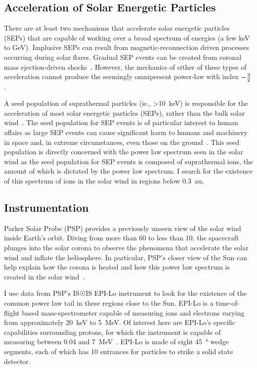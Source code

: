 \documentclass[letterpaper,11pt]{article}
\begin{document}
\subsection{Acceleration of Solar Energetic Particles}
There are at least two mechanisms that accelerate solar energetic particles (SEPs) that are capable of working over a broad spectrum of energies (a few \si{\kilo\electronvolt} to \si{\giga\electronvolt}).  Implusive SEPs can result from magnetic-reconnection driven processes occurring during solar flares.  Gradual SEP events can be created from coronal mass ejection-driven shocks~\citep{Desai2016}.  However, the mechanics of either of these types of acceleration cannot produce the seemingly omnipresent power-law with index $-{3 \over 2}$.

A seed population of suprathermal particles (ie., \SI{>10}{\kilo\electronvolt}) is responsible for the acceleration of most solar energetic particles (SEPs), rather than the bulk solar wind~\citep{Mewaldt2012}.  The seed population for SEP events is of particular interest to human affairs as large SEP events can cause significant harm to humans and machinery in space and, in extreme circumstances, even those on the ground~\citep{Desai2016}.  This seed population is directly concerned with the power law spectrum seen in the solar wind as the seed population for SEP events is composed of suprathermal ions, the amount of which is dictated by the power law spectrum.  I search for the existence of this spectrum of ions in the solar wind in regions below \SI{0.3}{\astronomicalunit}.

\subsection{Instrumentation}
\label{sec:intro:instrumentation}
Parker Solar Probe (PSP) provides a previously unseen view of the solar wind inside Earth's orbit.  Diving from more than 60 to less than \SI{10}{\solarradius}, the spacecraft plunges into the solar corona to observe the phenomena that accelerate the solar wind and inflate the heliosphere.  In particular, PSP's closer view of the Sun can help explain how the corona is heated and how this power law spectrum is created in the solar wind~\citep{McComas2014,McComas2007}.

I use data from PSP's IS$\Sun$IS EPI-Lo instrument to look for the existence of the common power law tail in these regions close to the Sun.  EPI-Lo is a time-of-flight based mass-spectrometer capable of measuring ions and electrons varying from approximately \SI{20}{\kilo\electronvolt} to \SI{5}{\mega\electronvolt}.  Of interest here are EPI-Lo's specific capabilities surrounding protons, for which the instrument is capable of measuring between 0.04 and \SI{7}{\mega\electronvolt}~\citep{McComas2014}.  EPI-Lo is made of eight \SI{45}{\degree} wedge segments, each of which has 10 entrances for particles to strike a solid state detector.
\end{document}
